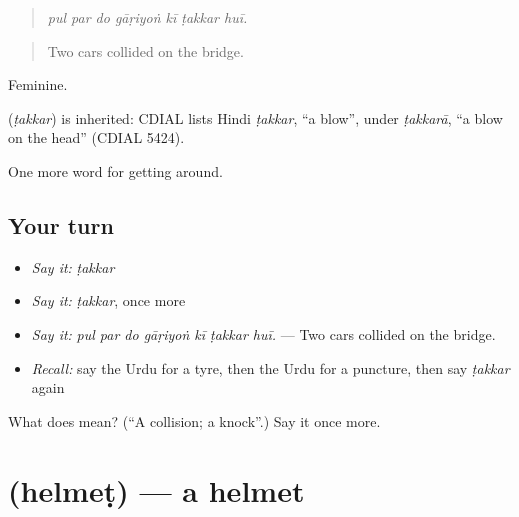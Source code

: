 \begin{quote}
      
\end{quote}

\begin{quote}
\emph{pul par do gāṛiyoṅ kī ṭakkar huī.}
\end{quote}

\begin{quote}
Two cars collided on the bridge.
\end{quote}

Feminine.

\begin{cousinweb}
\textbf{} (\emph{ṭakkar}) is inherited: CDIAL lists Hindi \emph{ṭakkar}, \textquotedblleft{}a blow\textquotedblright{}, under \emph{ṭakkarā}, \textquotedblleft{}a blow on the head\textquotedblright{} (CDIAL 5424).
\end{cousinweb}

\begin{grammarlens}[title={What you've built}]
One more word for getting around.
\end{grammarlens}

\subsection*{Your turn}
\begin{itemize}
\raggedright
  \item \emph{Say it:} \emph{ṭakkar}
  \item \emph{Say it:} \emph{ṭakkar}, once more
  \item \emph{Say it:} \emph{pul par do gāṛiyoṅ kī ṭakkar huī.} — Two cars collided on the bridge.
  \item \emph{Recall:} say the Urdu for a tyre, then the Urdu for a puncture, then say \emph{ṭakkar} again
\end{itemize}

\begin{tcolorbox}[breakable,colback=teal!4,colframe=teal!35!black,title={Before you move on}]
What does  mean? (\textquotedblleft{}A collision; a knock\textquotedblright{}.) Say it once more.
\end{tcolorbox}
\section[\texorpdfstring{\ur{ہیلمٹ} (helmeṭ)}{ہیلمٹ (helmeṭ)}]{ (helmeṭ) — a helmet}

